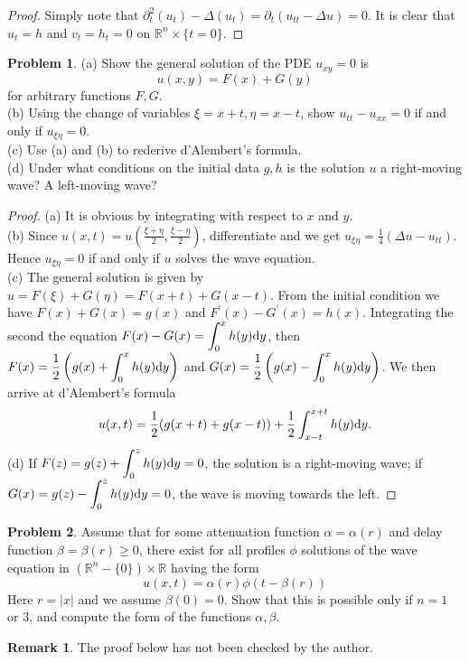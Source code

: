 \documentclass[hyperref,UTF8,12pt]{article}
\numberwithin{equation}{subsection}
\theoremstyle{plain}
\theoremstyle{definition}
\newtheorem{remark}{Remark}
\newtheorem{problem}{Problem}
\numberwithin{theorem}{section}
\numberwithin{lemma}{section}
\numberwithin{proposition}{section}
\numberwithin{remark}{section}
\numberwithin{corollary}{section}
\numberwithin{definition}{section}
\numberwithin{problem}{section}
\numberwithin{example}{section}
\def\dif{\textup{d}}
\newcommand{\dis}{\displaystyle}
\newcommand{\ptl}{\partial}
\newcommand{\mr}{\mathbb{R}}
\renewcommand{\geq}{\geqslant}
\begin{document}
\begin{proof}
Simply note that $\ptl_t^2(u_t)-\Delta(u_t)=\ptl_t(u_{tt}-\Delta u)=0$. It is clear that $u_t=h$ and $v_t=h_t=0$ on $\mr^n\times\{t=0\}$.
\end{proof}
\begin{problem}
(a) Show the general solution of the PDE $u_{x y}=0$ is\[u(x,y)=F(x)+G(y)\]for arbitrary functions $F,G$.\\
(b) Using the change of variables $\xi=x+t,\eta=x-t$, show $u_{tt}-u_{xx}=0$ if and only if $u_{\xi\eta}=0$.\\
(c) Use (a) and (b) to rederive d'Alembert's formula.\\
(d) Under what conditions on the initial data $g,h$ is the solution $u$ a right-moving wave? A left-moving wave?
\end{problem}
\begin{proof}
(a) It is obvious by integrating with respect to $x$ and $y$.\\
(b) Since $u(x,t)=u\left(\frac{\xi+\eta}{2},\frac{\xi-\eta}{2}\right)$, differentiate and we get $u_{\xi\eta}=\frac{1}{4}(\Delta u-u_{tt})$. Hence $u_{\xi\eta}=0$ if and only if $u$ solves the wave equation.\\
(c) The general solution is given by $u=F(\xi)+G(\eta)=F(x+t)+G(x-t)$. From the initial condition we have $F(x)+G(x)=g(x)$ and $F^\prime(x)-G^\prime(x)=h(x)$. Integrating the second the equation $F(x)-G(x)=\dis\int_0^xh(y)\dif y$, then $F(x)=\dis\frac{1}{2}\left(g(x)+\int_0^x h(y)\dif y\right)$ and $G(x)=\dis\frac{1}{2}\left(g(x)-\int_0^x h(y)\dif y\right)$. We then arrive at d'Alembert's formula\[u(x,t)=\frac{1}{2}(g(x+t)+g(x-t))+\frac{1}{2}\int_{x-t}^{x+t}h(y)\dif y.\]
(d) If $F(z)\dis=g(z)+\int_0^zh(y)\dif y=0$, the solution is a right-moving wave; if $G(x)\dis=g(z)-\int_0^zh(y)\dif y=0$, the wave is moving towards the left.
\end{proof}
\begin{problem}
Assume that for some attenuation function $\alpha=\alpha(r)$ and delay function $\beta=\beta(r)\geq0$, there exist for all profiles $\phi$ solutions of the wave equation in $(\mr^n-\{0\})\times\mr$ having the form\[u(x,t)=\alpha(r)\phi(t-\beta(r))\]
Here $r=|x|$ and we assume $\beta(0)=0$.
Show that this is possible only if $n=1$ or 3, and compute the form of the functions $\alpha, \beta$.
\end{problem}
\begin{remark}
The proof below has not been checked by the author.
\end{remark}
\end{document}
